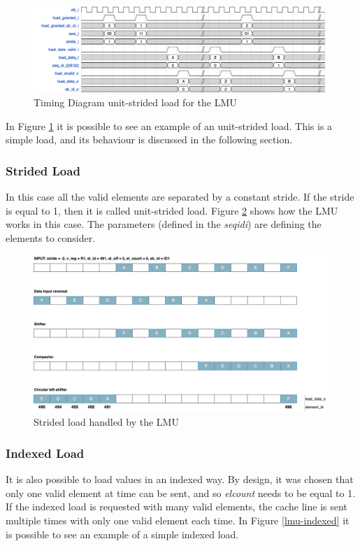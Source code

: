 \begin{figure}[H]
    \centering
    \includegraphics[scale = 0.35]{Chapter_2/img/lmu-time.png}
    \caption{Timing Diagram unit-strided load for the LMU}
    \label{lmu-time}
\end{figure}

In Figure \ref{lmu-time} it is possible to see an example of an unit-strided load. This is a simple load, and its behaviour is discussed in the following section.

\subsubsection{Strided Load}
In this case all the valid elements are separated by a constant stride. If the stride is equal to 1, then it is called unit-strided load.
Figure \ref{lmu-strided} shows how the LMU works in this case.
The parameters (defined in the \emph{seq\+id\+i}) are defining the elements to consider.
\begin{figure}[H]
    \centering
    \includegraphics[scale = 0.25]{Chapter_2/img/lmu-strided.png}
    \caption{Strided load handled by the LMU}
    \label{lmu-strided}
\end{figure}

\subsubsection{Indexed Load}
It is also possible to load values in an indexed way. By design, it was chosen that only one valid element at time can be sent, and so \emph{el\+count} needs to be equal to 1. If the indexed load is requested with many valid elements, the cache line is sent multiple times with only one valid element each time.
In Figure \ref{lmu-indexed} it is possible to see an example of a simple indexed load.

